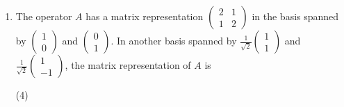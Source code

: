 \begin{enumerate}[label=\color{ocre}\textbf{\arabic*.}]
\begin{tasks}
		\task[\textbf{D.}] $\left(\frac{14}{3}, \frac{14}{3}, \frac{14}{3}\right)$
	\end{tasks}
	\begin{answer}
		\begin{align*}
		\text{Since }A_{i j}&=i j
		(\text{where }i, j=1,2,3, )\\
		\text{We obtain the matrix }A&=\left[\begin{array}{lll}1 & 2 & 3 \\ 2 & 4 & 6 \\ 3 & 6 & 9\end{array}\right]\\
		\text{For calculating eigen values }&\left|\begin{array}{ccc}1-\lambda & 2 & 3 \\ 2 & 4-\lambda & 6 \\ 3 & 6 & 9-\lambda\end{array}\right|=0
		\intertext{$(1-\lambda)[(4-\lambda)(9-\lambda)-36]-2[2(9-\lambda)-18]+3(12-3(4-\lambda))=0$}
		\intertext{$\Rightarrow-\lambda^{3}+\lambda^{2} \cdot 14=0 \Rightarrow \lambda^{2}(-\lambda+14)=0 \quad \Rightarrow \lambda=0,0,14$}
		\intertext{Also, directly for a $3 x 3$ matrix we can write $(0,0$, Trace of A) as Eigen values.}
		\end{align*}
		So the correct answer is \textbf{Option (C)}
	\end{answer}
	\item  The operator $A$ has a matrix representation $\left(\begin{array}{ll}2 & 1 \\ 1 & 2\end{array}\right)$ in the basis spanned by $\left(\begin{array}{l}1 \\ 0\end{array}\right)$ and $\left(\begin{array}{l}0 \\ 1\end{array}\right) .$ In another basis spanned by $\frac{1}{\sqrt{2}}\left(\begin{array}{l}1 \\ 1\end{array}\right)$ and $\frac{1}{\sqrt{2}}\left(\begin{array}{c}1 \\ -1\end{array}\right)$, the matrix representation of $A$ is
	{}
	\begin{tasks}(4)

\end{tasks}
\end{enumerate}
